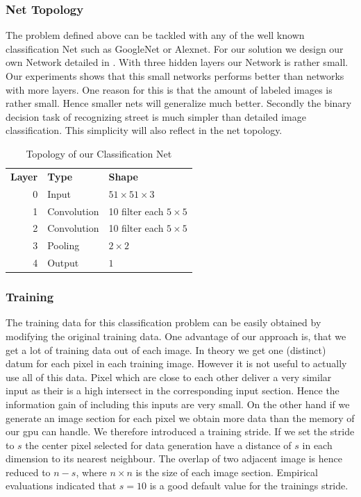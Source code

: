 \subsubsection{Net Topology}
The problem defined above can be tackled with any of the well known
classification Net such as GoogleNet or Alexnet. For our solution we design our
own Network detailed in . With three hidden layers our Network
is rather small. Our experiments shows that this small networks performs better
than networks with more layers. One reason for this is that the amount of
labeled images is rather small. Hence smaller nets will generalize much better.
Secondly the binary decision task of recognizing street is much simpler than
detailed image classification. This simplicity will also reflect in the net
topology.

\begin{table}[H]
	\normalsize
	\centering
\begin{tabular}{r l l}
	\textbf{Layer} & \textbf{Type}  & \textbf{Shape}  \\
	0     & Input &  $51 \times 51 \times 3$ \\
	1     & Convolution & 10 filter  each $5 \times 5$ \\
	2     & Convolution & 10 filter  each $5 \times 5$  \\
	3     & Pooling     & $2 \times 2$ \\
	4     & Output     & $1$ \\
\end{tabular}
\caption{Topology of our Classification Net}
\label{tab:topo}
\end{table}

\subsubsection{Training}

The training data for this classification problem can be easily obtained by modifying the original training data. One advantage of our approach is, that we get a lot of training data out of each image. In theory we get one (distinct) datum for each pixel in each training image. However it is not useful to actually use all of this data. Pixel which are close to each other deliver a very similar input as their is a high intersect in the corresponding input section. Hence the information gain of including this inputs are very small. On the other hand if we generate an image section for each pixel we obtain more data than the memory of our gpu can handle. We therefore introduced a training stride. If we set the stride to $s$ the center pixel selected for data generation have a distance of $s$ in each dimension to its nearest neighbour. The overlap of two adjacent image is hence reduced to $n-s$, where $n \times n$ is the size of each image section. Empirical evaluations indicated that $s=10$ is a good default value for the trainings stride.



